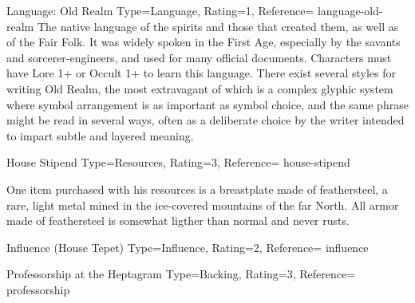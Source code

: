 \begin{Merit}{Language: Old Realm}{%
    Type=Language,
    Rating=1,
    Reference=\cite*[p.~162]{ex3}
}{language-old-realm}
    The native language of the spirits and those that created them, as well as
    of the Fair Folk. It was widely spoken in the First Age, especially by the
    savants and sorcerer-engineers, and used for many official documents.
    Characters must have Lore 1+ or Occult 1+ to learn this language. There
    exist several styles for writing Old Realm, the most extravagant of which
    is a complex glyphic system where symbol arrangement is as important as
    symbol choice, and the same phrase might be read in several ways, often as
    a deliberate choice by the writer intended to impart subtle and layered
    meaning.
\end{Merit}


\DocumentColumnBreak
\begin{Merit}{House Stipend}{%
    Type=Resources,
    Rating=3,
    Reference=\cite*[p.~164]{ex3}
}{house-stipend}
    \TBW


    One item purchased with his resources is a breastplate made of
    feathersteel, a rare, light metal mined in the ice-covered mountains of
    the far North. All armor made of feathersteel is somewhat ligther than
    normal and never rusts.

\end{Merit}


\begin{Merit}{Influence (House Tepet)}{%
    Type=Influence,
    Rating=2,
    Reference=\cite*[p.~162]{ex3}
}{influence}
    \TBW
\end{Merit}


\begin{Merit}{Professorship at the Heptagram}{%
    Type=Backing,
    Rating=3,
    Reference=\cite*[p.~159]{ex3}
}{professorship}
    \TBW
\end{Merit}


\printbibliography[title=References]


